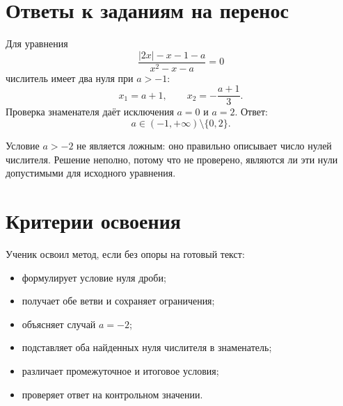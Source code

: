 \section{Ответы к заданиям на перенос}

\begin{propertybox}[Задание 1]
  Для уравнения
  \[
    \frac{|2x|-x-1-a}{x^2-x-a}=0
  \]
  числитель имеет два нуля при \(a>-1\):
  \[
    x_1=a+1,
    \qquad
    x_2=-\frac{a+1}{3}.
  \]
  Проверка знаменателя даёт исключения \(a=0\) и \(a=2\). Ответ:
  \[
    \boxed{a\in(-1,+\infty)\setminus\{0,2\}}.
  \]
\end{propertybox}

\begin{propertybox}[Задание 2]
  Условие \(a>-2\) не является ложным: оно правильно описывает число
  нулей числителя. Решение неполно, потому что не проверено, являются ли эти
  нули допустимыми для исходного уравнения.
\end{propertybox}

\clearpage
\section{Критерии освоения}

\begin{questionsbox}
  \small
  Ученик освоил метод, если без опоры на готовый текст:
  \par\vspace{0.35em}
  \begin{minipage}[t]{0.485\linewidth}
    \begin{itemize}[itemsep=0.18em,topsep=0.15em]
      \item формулирует условие нуля дроби;
      \item получает обе ветви и сохраняет ограничения;
      \item объясняет случай \(a=-2\);
    \end{itemize}
  \end{minipage}\hfill
  \begin{minipage}[t]{0.485\linewidth}
    \begin{itemize}[itemsep=0.18em,topsep=0.15em]
      \item подставляет оба найденных нуля числителя в знаменатель;
      \item различает промежуточное и итоговое условия;
      \item проверяет ответ на контрольном значении.
    \end{itemize}
  \end{minipage}
\end{questionsbox}


